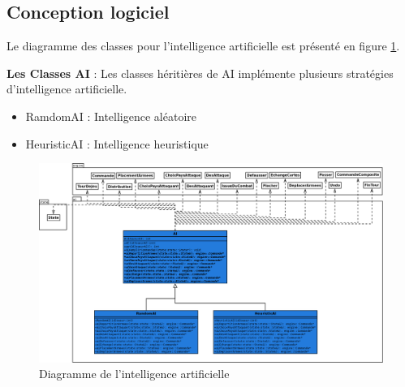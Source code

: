 \newpage
\subsection{Conception logiciel}
Le diagramme des classes pour l’intelligence artificielle est présenté en figure \ref{fig:ai}.

\textbf{Les Classes AI} : Les classes héritières de AI implémente plusieurs stratégies d'intelligence artificielle.
\begin{itemize}
    \item RamdomAI : Intelligence aléatoire
    \item HeuristicAI : Intelligence heuristique
\end{itemize}

\begin{landscape}
    \begin{figure}[!htbp]
        \centering
        \includegraphics[width=17cm]{Images/ai.png}
        \caption{Diagramme de l'intelligence artificielle}
        \label{fig:ai}
    \end{figure}
\end{landscape}

